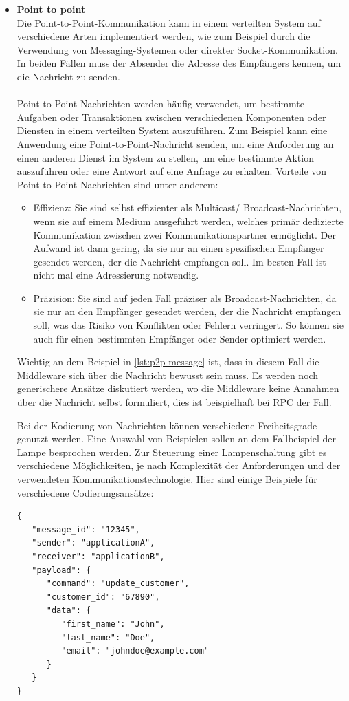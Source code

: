 \documentclass[../vs-script-first-v01.tex]{subfiles}
\begin{document}
\begin{itemize}
\item \textbf{Point to point}\\
Die Point-to-Point-Kommunikation kann in einem verteilten System auf verschiedene Arten implementiert werden, wie zum Beispiel durch die Verwendung von Messaging-Systemen oder direkter Socket-Kommunikation. In beiden Fällen muss der Absender die Adresse des Empfängers kennen, um die Nachricht zu senden.
\\\\
Point-to-Point-Nachrichten werden häufig verwendet, um bestimmte Aufgaben oder Transaktionen zwischen verschiedenen Komponenten oder Diensten in einem verteilten System auszuführen. Zum Beispiel kann eine Anwendung eine Point-to-Point-Nachricht senden, um eine Anforderung an einen anderen Dienst im System zu stellen, um eine bestimmte Aktion auszuführen oder eine Antwort auf eine Anfrage zu erhalten. Vorteile von Point-to-Point-Nachrichten sind unter anderem:
\begin{itemize}
\item Effizienz: Sie sind selbst effizienter als Multicast/ Broadcast-Nachrichten, wenn sie auf einem Medium ausgeführt werden, welches primär dedizierte Kommunikation zwischen zwei Kommunikationspartner ermöglicht. Der Aufwand ist dann gering, da sie nur an einen spezifischen Empfänger gesendet werden, der die Nachricht empfangen soll. Im besten Fall ist nicht mal eine Adressierung notwendig. 
\item Präzision: Sie sind auf jeden Fall präziser als Broadcast-Nachrichten, da sie nur an den Empfänger gesendet werden, der die Nachricht empfangen soll, was das Risiko von Konflikten oder Fehlern verringert. So können sie auch für einen bestimmten Empfänger oder Sender optimiert werden.
\end{itemize} 
Wichtig an dem Beispiel in \ref{lst:p2p-message} ist, dass in diesem Fall die Middleware sich über die Nachricht bewusst sein muss. Es werden noch generischere Ansätze diskutiert werden, wo die Middleware keine Annahmen über die Nachricht selbst formuliert, dies ist beispielhaft bei RPC der Fall. 

Bei der Kodierung von Nachrichten können verschiedene Freiheitsgrade genutzt werden. Eine Auswahl von Beispielen sollen an dem Fallbeispiel der Lampe besprochen werden. Zur Steuerung einer Lampenschaltung gibt es verschiedene Möglichkeiten, je nach Komplexität der Anforderungen und der verwendeten Kommunikationstechnologie. Hier sind einige Beispiele für verschiedene Codierungsansätze:
\newpage
\begin{lstlisting}[caption={Message für Point to Point Kommunikation},captionpos=b,label={lst:p2p-message}]
{
   "message_id": "12345",
   "sender": "applicationA",
   "receiver": "applicationB",
   "payload": {
      "command": "update_customer",
      "customer_id": "67890",
      "data": {
         "first_name": "John",
         "last_name": "Doe",
         "email": "johndoe@example.com"
      }
   }
}
\end{lstlisting}


\end{itemize}
\end{document}
